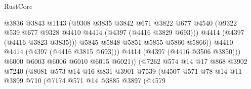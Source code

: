 \begin{lexlean}{RustCore}
\begin{coremodule}
                                      @3836
                                      @3843
                                      @1143
                                      (@9308
                                        @3835
                                        @3842
                                        @671
                                        @3822
                                        @677
                                        @4540
                                        (@9322
                                          @539
                                          @677
                                          @9328
                                          @4410
                                          @4414
                                          (@4397 (@4416 @3829 @693)))
                                        @4414
                                        (@4397 (@4416 @3823 @3835)))
                                      @5845
                                      @5848
                                      @5851
                                      @5855
                                      @5860
                                      @5866))
                                  @4410
                                  @4414
                                  (@4397 (@4416 @3815 @693)))
                                @4414
                                (@4397 (@4416 @3506 @3850)))
                              @6000
                              @6003
                              @6006
                              @6010
                              @6015
                              @6021))
                          (@7262
                            @574
                            @14
                            @17
                            @868
                            @3902
                            @7240
                            (@8081
                              @573
                              @14
                              @16
                              @831
                              @3901
                              @7539
                              (@4507
                                @571
                                @78
                                @14
                                @11
                                @3899
                                @710
                                (@7174
                                  @571
                                  @14
                                  @3885
                                  @3897
                                  (@4579

\end{coremodule}
\end{lexlean}
